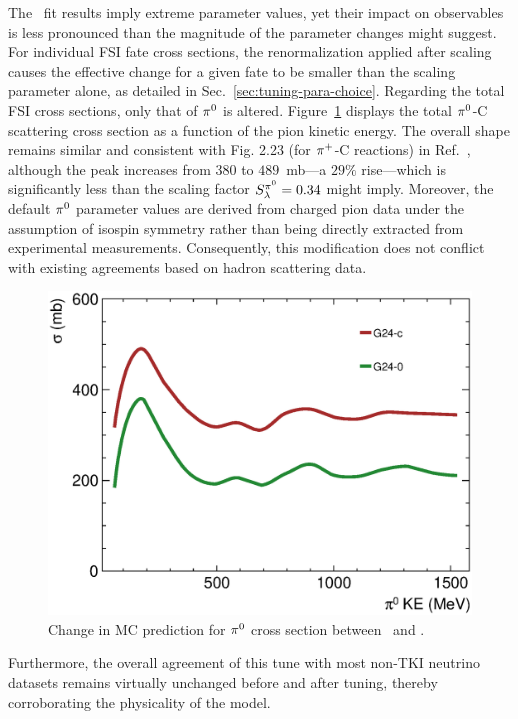 The \gC\ fit results imply extreme parameter values, yet their impact on observables is less pronounced than the magnitude of the parameter changes might suggest. 
For individual FSI fate cross sections, the renormalization applied after scaling causes the effective change for a given fate to be smaller than the scaling parameter alone, as detailed in Sec.~\ref{sec:tuning-para-choice}.
Regarding the total FSI cross sections, only that of $\pi^0$ is altered.
Figure~\ref{fig:pizmfp_change} displays the total $\pi^0$-C scattering cross section as a function of the pion kinetic energy. 
The overall shape remains similar and consistent with Fig. 2.23 (for $\pi^+$-C reactions) in Ref.~\cite{Andreopoulos:2015wxa}, although the peak increases from $380$ to $489$~mb---a $29\%$ rise---which is significantly less than the scaling factor $S_\lambda^{\pi^{0}}=0.34$ might imply. 
Moreover, the default $\pi^0$ parameter values are derived from charged pion data under the assumption of isospin symmetry rather than being directly extracted from experimental measurements. 
Consequently, this modification does not conflict with existing agreements based on hadron scattering data.
\begin{figure}[!htb] 	
    \centering 		
    \includegraphics[width=\sgfigwid\textwidth]{figures/tuning/pi0mfp_change_covfix.eps}
    \caption{\label{fig:pizmfp_change} Change in MC prediction for $\pi^0$ cross section between \gZero\ and \gC. } 
\end{figure}
Furthermore, the overall agreement of this tune with most non-TKI neutrino datasets remains virtually unchanged before and after tuning, thereby corroborating the physicality of the model.

